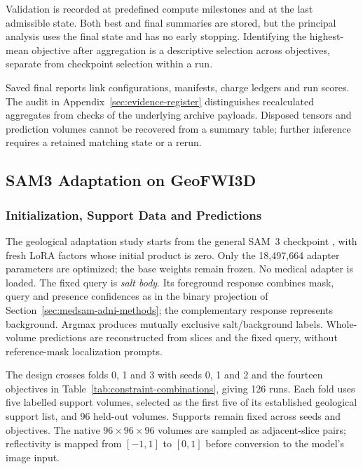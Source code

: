 \documentclass[12pt,a4paper]{article}
\begin{document}
Validation is recorded at predefined compute milestones and at the last
admissible state. Both best and final summaries are stored, but the
principal analysis uses the final state and has no early stopping.
Identifying the highest-mean objective after aggregation is a descriptive
selection across objectives, separate from checkpoint selection within
a run.

Saved final reports link configurations, manifests, charge ledgers and
run scores. The audit in Appendix~\ref{sec:evidence-register} distinguishes
recalculated aggregates from checks of the underlying archive payloads.
Disposed tensors and prediction volumes cannot be recovered from a
summary table; further inference requires a retained matching state
or a rerun.

\subsection{SAM3 Adaptation on GeoFWI3D}
\label{sec:sam3-methods}

\subsubsection{Initialization, Support Data and Predictions}

The geological adaptation study starts from the general SAM~3 checkpoint
\cite{carion2025sam3}, with fresh LoRA factors whose initial product is
zero. Only the 18,497,664 adapter parameters are optimized; the base
weights remain frozen. No medical adapter is loaded. The fixed query is
\emph{salt body}. Its foreground response combines mask, query and
presence confidences as in the binary projection of
Section~\ref{sec:medsam-adni-methods}; the complementary response represents
background. Argmax produces mutually exclusive salt/background labels.
Whole-volume predictions are reconstructed from slices and the fixed
query, without reference-mask localization prompts.

The design crosses folds 0, 1 and 3 with seeds 0, 1 and 2 and the fourteen
objectives in Table~\ref{tab:constraint-combinations}, giving 126 runs.
Each fold uses five labelled support volumes, selected as the first five
of its established geological support list, and 96 held-out volumes.
Supports remain fixed across seeds and objectives. The native
$96\times96\times96$ volumes are sampled as adjacent-slice pairs;
reflectivity is mapped from $[-1,1]$ to $[0,1]$ before conversion to the
model's image input.
\end{document}
